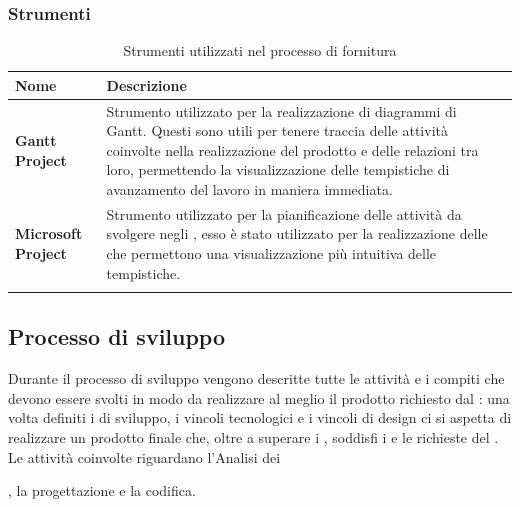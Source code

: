 \subsubsection{Strumenti}

\setlength{\freewidth}{\dimexpr\textwidth-0\tabcolsep}
	\renewcommand{\arraystretch}{1.5}
	\setlength{\aboverulesep}{0pt}
	\setlength{\belowrulesep}{0pt}
	\begin{longtable}{L{.210\freewidth} L{.6\freewidth} L{.080\freewidth}}
		\textbf{Nome} & \textbf{Descrizione} \\
		\toprule
		\endhead		
		\textbf{Gantt Project} & Strumento utilizzato per la realizzazione di  diagrammi di Gantt. Questi sono utili per tenere traccia delle attività coinvolte nella realizzazione del prodotto e delle relazioni tra loro, permettendo la visualizzazione delle tempistiche di avanzamento del lavoro in maniera immediata. \\
		\textbf{Microsoft Project} & Strumento utilizzato per la pianificazione delle attività da svolgere negli , esso è stato utilizzato per la realizzazione delle  che permettono una visualizzazione più intuitiva delle tempistiche. \\
		\bottomrule
		\hiderowcolors
		\caption{Strumenti utilizzati nel processo di fornitura}
	\end{longtable}


\subsection{Processo di sviluppo}
Durante il processo di sviluppo vengono descritte tutte le attività e i compiti che devono essere svolti in modo da realizzare al meglio il prodotto richiesto dal : una volta definiti i  di sviluppo, i vincoli tecnologici e i vincoli di design ci si aspetta di realizzare un prodotto finale che, oltre a superare i , soddisfi i  e le richieste del . Le attività coinvolte riguardano l'Analisi dei , la progettazione e la codifica.

